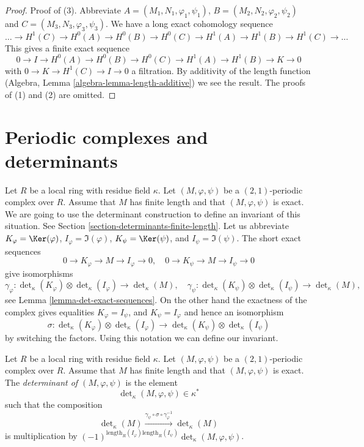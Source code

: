 \begin{proof}
Proof of (3). Abbreviate $A = (M_1, N_1, \varphi_1, \psi_1)$,
$B = (M_2, N_2, \varphi_2, \psi_2)$ and $C = (M_3, N_3, \varphi_3, \psi_3)$.
We have a long exact cohomology sequence
$$
\ldots
\to H^1(C)
\to H^0(A)
\to H^0(B)
\to H^0(C)
\to H^1(A)
\to H^1(B)
\to H^1(C)
\to \ldots
$$
This gives a finite exact sequence
$$
0 \to I
\to H^0(A)
\to H^0(B)
\to H^0(C)
\to H^1(A)
\to H^1(B)
\to K \to 0
$$
with $0 \to K \to H^1(C) \to I \to 0$ a filtration. By additivity of
the length function (Algebra, Lemma \ref{algebra-lemma-length-additive})
we see the result.
The proofs of (1) and (2) are omitted.
\end{proof}





\section{Periodic complexes and determinants}
\label{section-periodic-complexes-determinants}

\noindent
Let $R$ be a local ring with residue field $\kappa$.
Let $(M, \varphi, \psi)$ be a $(2, 1)$-periodic complex over $R$.
Assume that $M$ has finite length and that $(M, \varphi, \psi)$ is
exact. We are going to use the determinant construction to define
an invariant of this situation. See
Section \ref{section-determinants-finite-length}.
Let us abbreviate
$K_\varphi = \Ker(\varphi)$,
$I_\varphi = \Im(\varphi)$,
$K_\psi = \Ker(\psi)$, and
$I_\psi = \Im(\psi)$.
The short exact sequences
$$
0 \to K_\varphi \to M \to I_\varphi \to 0, \quad
0 \to K_\psi \to M \to I_\psi \to 0
$$
give isomorphisms
$$
\gamma_\varphi :
\det\nolimits_\kappa(K_\varphi)
\otimes
\det\nolimits_\kappa(I_\varphi)
\longrightarrow
\det\nolimits_\kappa(M), \quad
\gamma_\psi :
\det\nolimits_\kappa(K_\psi)
\otimes
\det\nolimits_\kappa(I_\psi)
\longrightarrow
\det\nolimits_\kappa(M),
$$
see Lemma \ref{lemma-det-exact-sequences}.
On the other hand the exactness of the complex gives equalities
$K_\varphi = I_\psi$, and $K_\psi = I_\varphi$
and hence an isomorphism
$$
\sigma :
\det\nolimits_\kappa(K_\varphi)
\otimes
\det\nolimits_\kappa(I_\varphi)
\longrightarrow
\det\nolimits_\kappa(K_\psi)
\otimes
\det\nolimits_\kappa(I_\psi)
$$
by switching the factors. Using this notation we can define our invariant.

\begin{definition}
\label{definition-periodic-determinant}
Let $R$ be a local ring with residue field $\kappa$.
Let $(M, \varphi, \psi)$ be a $(2, 1)$-periodic complex over $R$.
Assume that $M$ has finite length and that $(M, \varphi, \psi)$ is
exact. The {\it determinant of $(M, \varphi, \psi)$} is
the element
$$
\det\nolimits_\kappa(M, \varphi, \psi) \in \kappa^*
$$
such that the composition
$$
\det\nolimits_\kappa(M)
\xrightarrow{\gamma_\psi \circ \sigma \circ \gamma_\varphi^{-1}}
\det\nolimits_\kappa(M)
$$
is multiplication by
$(-1)^{\text{length}_R(I_\varphi)\text{length}_R(I_\psi)}
\det\nolimits_\kappa(M, \varphi, \psi)$.
\end{definition}

